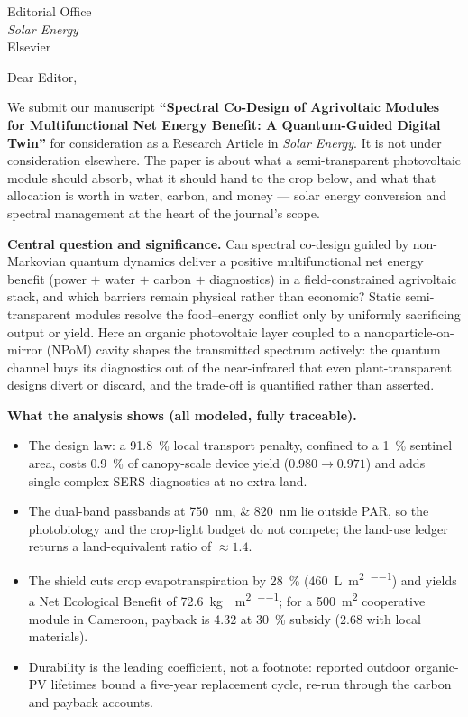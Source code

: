 \documentclass[10pt]{letter}
\begin{document}
\sloppy

\begin{letter}{Editorial Office\\
\textit{Solar Energy}\\
Elsevier}

\opening{Dear Editor,}

We submit our manuscript \textbf{``Spectral Co-Design of Agrivoltaic Modules for Multifunctional Net Energy Benefit: A Quantum-Guided Digital Twin''} for consideration as a Research Article in \textit{Solar Energy}. It is not under consideration elsewhere. The paper is about what a semi-transparent photovoltaic module should absorb, what it should hand to the crop below, and what that allocation is worth in water, carbon, and money --- solar energy conversion and spectral management at the heart of the journal's scope.

\noindent\textbf{Central question and significance.}
Can spectral co-design guided by non-Markovian quantum dynamics deliver a positive multifunctional net energy benefit (power $+$ water $+$ carbon $+$ diagnostics) in a field-constrained agrivoltaic stack, and which barriers remain physical rather than economic? Static semi-transparent modules resolve the food--energy conflict only by uniformly sacrificing output or yield. Here an organic photovoltaic layer coupled to a nanoparticle-on-mirror (NPoM) cavity shapes the transmitted spectrum actively: the quantum channel buys its diagnostics out of the near-infrared that even plant-transparent designs divert or discard, and the trade-off is quantified rather than asserted.

\noindent\textbf{What the analysis shows (all modeled, fully traceable).}
\begin{itemize}
\item The design law: a \qty{91.8}{\percent} local transport penalty, confined to a \qty{1}{\percent} sentinel area, costs \qty{0.9}{\percent} of canopy-scale device yield ($0.980 \to \num{0.971}$) and adds single-complex SERS diagnostics at no extra land.
\item The dual-band passbands at \qtylist{750;820}{\nm} lie outside PAR, so the photobiology and the crop-light budget do not compete; the land-use ledger returns a land-equivalent ratio of $\approx 1.4$.
\item The shield cuts crop evapotranspiration by \qty{28}{\percent} (\qty{460}{\L\per\m\squared\per\yr}) and yields a Net Ecological Benefit of \qty{72.6}{\kg{}\per\m\squared\per\yr}; for a \qty{500}{\m\squared} cooperative module in Cameroon, payback is \qty{4.32}{\yr} at \qty{30}{\percent} subsidy (\qty{2.68}{\yr} with local materials).
\item Durability is the leading coefficient, not a footnote: reported outdoor organic-PV lifetimes bound a five-year replacement cycle, re-run through the carbon and payback accounts.
\end{itemize}


\end{letter}
\end{document}
